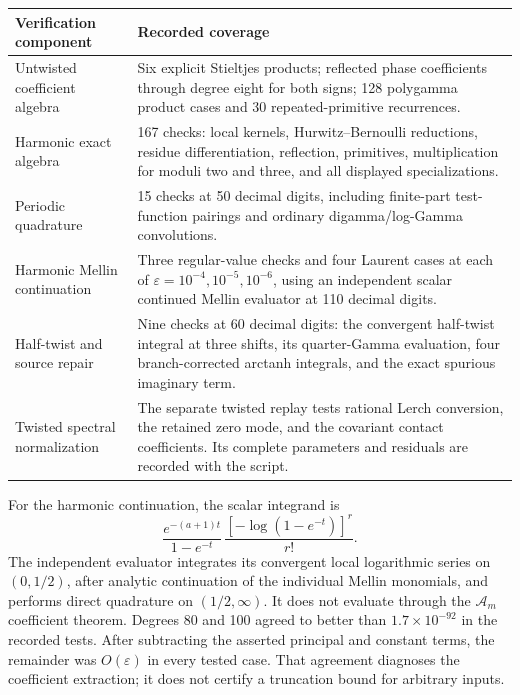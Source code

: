 \begin{center}
\begin{tabularx}{\textwidth}{@{}p{}X@{}}
\toprule
Verification component & Recorded coverage\\
\midrule
Untwisted coefficient algebra &
Six explicit Stieltjes products; reflected phase coefficients through
degree eight for both signs; 128 polygamma product cases and
30 repeated-primitive recurrences.\\[3pt]
Harmonic exact algebra &
167 checks: local kernels, Hurwitz--Bernoulli reductions, residue
differentiation, reflection, primitives, multiplication for moduli
two and three, and all displayed specializations.\\[3pt]
Periodic quadrature &
15 checks at 50 decimal digits, including finite-part test-function
pairings and ordinary digamma/log-Gamma convolutions.\\[3pt]
Harmonic Mellin continuation &
Three regular-value checks and four Laurent cases at each of
\(\varepsilon=10^{-4},10^{-5},10^{-6}\), using an independent scalar
continued Mellin evaluator at 110 decimal digits.\\[3pt]
Half-twist and source repair &
Nine checks at 60 decimal digits: the convergent half-twist integral
at three shifts, its quarter-Gamma evaluation, four branch-corrected
arctanh integrals, and the exact spurious imaginary term.\\[3pt]
Twisted spectral normalization &
The separate twisted replay tests rational Lerch conversion,
the retained zero mode, and the covariant contact coefficients.
Its complete parameters and residuals are recorded with the script.\\
\bottomrule
\end{tabularx}
\end{center}

For the harmonic continuation, the scalar integrand is
\[
 \frac{e^{-(a+1)t}}{1-e^{-t}}\,
       \frac{[-\log(1-e^{-t})]^r}{r!}.
\]
The independent evaluator integrates its convergent local
logarithmic series on \((0,1/2)\), after analytic continuation of the
individual Mellin monomials, and performs direct quadrature on
\((1/2,\infty)\). It does not evaluate through the
\(\mathcal A_m\) coefficient theorem. Degrees 80 and 100 agreed to
better than \(1.7\times10^{-92}\) in the recorded tests. After
subtracting the asserted principal and constant terms, the remainder
was \(O(\varepsilon)\) in every tested case. That agreement diagnoses
the coefficient extraction; it does not certify a truncation bound
for arbitrary inputs.

